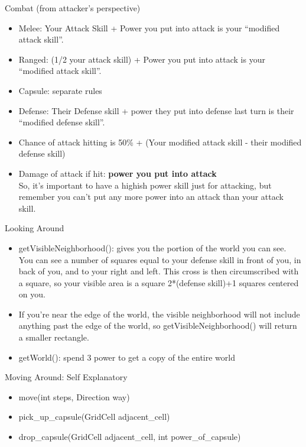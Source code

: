 \documentclass[aspectratio=169]{beamer}
\begin{document}
\begin{frame}{Combat (from attacker's perspective)}
  \begin{itemize}
  \item Melee: Your Attack Skill + Power you put into attack is your
    ``modified attack skill''.
  \item Ranged: (1/2 your attack skill) + Power you put into attack is
    your ``modified attack skill''.
  \item Capsule: separate rules
  \item Defense: Their Defense skill + power they put into defense
    last turn is their ``modified defense skill''.
  \item Chance of attack hitting is 50\% + (Your modified attack
    skill - their modified defense skill)
  \item Damage of attack if hit: \textbf{power you put into attack}\\
    So, it's important to have a highish power skill just for
    attacking, but remember you can't put any more power into an
    attack than your attack skill.
  \end{itemize}
\end{frame}

\begin{frame}{Looking Around}
  \begin{itemize}
   \item getVisibleNeighborhood(): gives you the portion of the world
     you can see.  You can see a number of squares equal to your
     defense skill in front of you, in back of you, and to your right
     and left.  This cross is then circumscribed with a square, so
     your visible area is a square 2*(defense skill)+1 squares
     centered on you.
   \item If you're near the edge of the world, the visible
     neighborhood will not include anything past the edge of the
     world, so getVisibleNeighborhood() will return a smaller
     rectangle.
   \item getWorld(): spend 3 power to get a copy of the entire world
  \end{itemize}
\end{frame}

\begin{frame}{Moving Around: Self Explanatory}
 \begin{itemize}
  \item move(int steps, Direction way)
  \item pick\_up\_capsule(GridCell adjacent\_cell)
  \item drop\_capsule(GridCell adjacent\_cell, int power\_of\_capsule)
 \end{itemize}
\end{frame}
\end{document}
